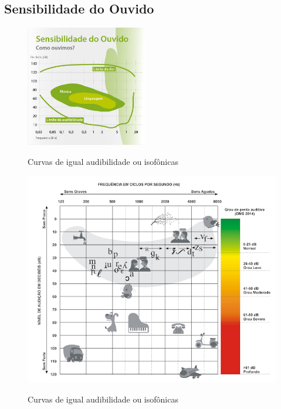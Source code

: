 \documentclass[
	article,			%
	11pt,				%
	oneside,			%
	a4paper,			%
	english,			%
	brazil,				%
	sumario=tradicional
	]{abntex2}
\begin{document}
\subsection{Sensibilidade do Ouvido}
\begin{figure}[h]
\caption{Curvas de igual audibilidade ou
isofônicas}
\centering %
\includegraphics[width=200]{Limiar de audição.jpg} %
\label{Curvas de igual audibilidade ou
isofônicas}
\end{figure}

\begin{figure}[h]
\caption{Curvas de igual audibilidade ou
isofônicas}
\centering %
\includegraphics{Audiograma de sons.png} %
\label{Curvas de igual audibilidade ou
isofônicas}
\end{figure}
\end{document}
